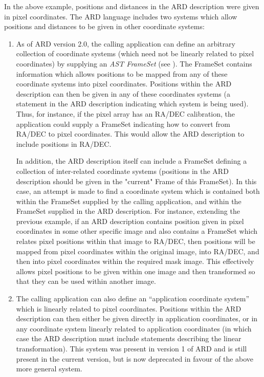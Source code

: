 In the above example, positions and distances in the ARD description were given
in pixel coordinates. The ARD language includes two systems which allow 
positions and distances to be given in other coordinate systems:
\begin{enumerate}

\item As of ARD version 2.0, the calling application can define an
arbitrary collection of coordinate systems (which need not be linearly
related to pixel coordinates) by supplying an {\em AST FrameSet} (see 
). The FrameSet contains information which allows
positions to be mapped from any of these coordinate systems into pixel
coordinates. Positions within the ARD description can then be given 
in any of these coordinates systems (a statement in the ARD description
indicating which system is being used). Thus, for instance, if the pixel
array has an RA/DEC calibration, the application could supply a FrameSet
indicating how to convert from RA/DEC to pixel coordinates. This would
allow the ARD description to include positions in RA/DEC.

In addition, the ARD description itself can include a FrameSet defining
a collection of inter-related coordinate systems (positions in the ARD
description should be given in the "current" Frame of this FrameSet). In
this case, an attempt is made to find a coordinate system which is
contained both within the FrameSet supplied by the calling application,
and within the FrameSet supplied in the ARD description. For instance,
extending the previous example, if an ARD description contains position 
given in pixel coordinates in some other specific image and also contains a 
FrameSet which relates pixel positions within that image to RA/DEC, then 
positions will be mapped from pixel coordinates within the original
image, into RA/DEC, and then into pixel coordinates within the required
mask image. This effectively allows pixel positions to be given within
one image and then transformed so that they can be used within another 
image.

\item The calling application can also define an ``application coordinate 
system'' which is linearly related to pixel coordinates. Positions within the 
ARD description can then either be given directly in application coordinates, 
or in any coordinate system linearly related to application coordinates
(in which case the ARD description must include statements describing the
linear transformation). This system was present in version 1 of ARD and
is still present in the current version, but is now deprecated in favour
of the above more general system.

\end{enumerate}

